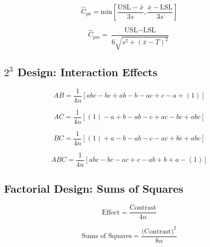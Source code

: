 \documentclass[a4paper,12pt]{article}
\begin{document}
\[ \hat{C}_{pk} = \mbox{min} \left[\frac{\mbox{USL} - \bar{x}}{3s},\frac{\bar{x} - \mbox{LSL}}{3s} \right] \]

\[ \hat{C}_{pm} = \frac{\mbox{USL} - \mbox{LSL}}{6\sqrt{s^2+(\bar{x}-T)^2}}\]
\bigskip
%
\subsection*{$2^3$ Design: Interaction Effects}

\[ AB = \frac{1}{4n} \left[ abc - bc + ab - b - ac + c - a + (1) \right] \]

\[ AC = \frac{1}{4n} \left[ (1) - a + b - ab -c + ac - bc + abc \right] \]

\[ BC = \frac{1}{4n} \left[ (1) + a - b - ab - c - ac + bc + abc \right] \]

\[ABC = \frac{1}{4n} \left[ abc - bc - ac + c - ab + b +  a - (1) \right] \]

\bigskip

\subsection*{Factorial Design: Sums of Squares}

\[\mbox{Effect} =  \frac{\mbox{Contrast}}{4n}\]

\[\mbox{Sums of Squares} =  \frac{\mbox{(Contrast)}^2}{8n}\]
\end{document}
